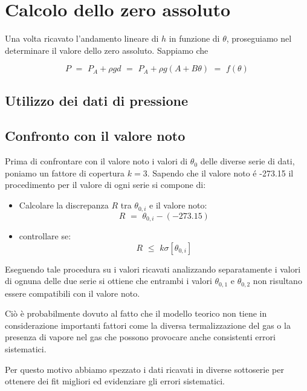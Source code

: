 \section{Calcolo dello zero assoluto}

Una volta ricavato l'andamento lineare di $h$ in funzione di $\theta$, proseguiamo nel determinare il valore dello zero assoluto. Sappiamo che 

\begin{equation}
	P \,\, = \,\, P_A + \rho g d \,\, = \,\, P_A + \rho g (A + B \theta) \,\, = \,\, f(\theta)
\end{equation}

\subsection{Utilizzo dei dati di pressione}



\subsection{Confronto con il valore noto}

Prima di confrontare con il valore noto i valori di $\theta_0$ delle diverse serie di dati, poniamo un fattore di copertura $k=3$. Sapendo che il valore noto é -273.15 il procedimento per il valore di ogni serie si compone di:

\begin{itemize}
\item Calcolare la discrepanza $R$ tra $\theta_{0,i}$ e il valore noto:
\begin{equation*}
	R \,\, = \,\, \theta_{0,i} - (-273.15)
\end{equation*}
\item controllare se:
\begin{equation*}
	R \,\, \leq \,\, k \sigma[\theta_{0,i}]
\end{equation*}
\end{itemize}

Eseguendo tale procedura su i valori ricavati analizzando separatamente i valori di ognuna delle due serie si ottiene che entrambi i valori $\theta_{0,1}$ e $\theta_{0,2}$ non risultano essere compatibili con il valore noto.

Ciò è probabilmente dovuto al fatto che il modello teorico non tiene in considerazione importanti fattori come la diversa termalizzazione del gas o la presenza di vapore nel gas che possono provocare anche consistenti errori sistematici.

Per questo motivo abbiamo spezzato i dati ricavati in diverse sottoserie per ottenere dei fit migliori ed evidenziare gli errori sistematici.